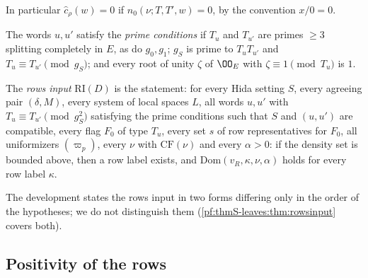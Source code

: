 In particular $\hat c_\rho(w)=0$ if $n_0(\nu;T,T',w)=0$, by the convention $x/0=0$.

\begin{definition}\label{pf:thmS-leaves:def:rowsinput}
The words $u,u'$ satisfy the \emph{prime conditions} if $T_u$ and $T_{u'}$ are primes $\ge3$ splitting completely in $E$,
as do $g_0,g_1$; $g_S$ is prime to $T_uT_{u'}$ and $T_u\equiv T_{u'}\pmod{g_S}$; and every root of unity $\zeta$ of $\OO_E$
with $\zeta\equiv1\pmod{T_u}$ is $1$.

The \emph{rows input} $\mathrm{RI}(D)$ is the statement: for every Hida setting $S$, every agreeing pair $(\delta,M)$, every
system of local spaces $L$, all words $u,u'$ with $T_u\equiv T_{u'}\pmod{g_S^2}$ satisfying the prime conditions such that $S$
and $(u,u')$ are compatible, every flag $F_0$ of type $T_u$, every set $s$ of row representatives for $F_0$, all
uniformizers $(\varpi_p)$, every $\nu$ with $\mathrm{CF}(\nu)$ and every $\alpha>0$: if the density set is bounded above,
then a row label exists, and $\mathrm{Dom}(v_R,\kappa,\nu,\alpha)$ holds for every row label $\kappa$.
\end{definition}

The development states the rows input in two forms differing only in the order of the hypotheses; we do not distinguish
them (\cref{pf:thmS-leaves:thm:rowsinput} covers both).

\subsection{Positivity of the rows}\label{pf:thmS-leaves:ss:positivity}

